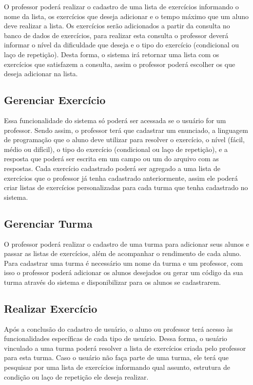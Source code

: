 O professor poderá realizar o cadastro de uma lista de exercícios informando o nome da lista, os exercícios que deseja adicionar e o tempo máximo que um aluno deve realizar a lista. Os exercícios serão adicionados a partir da consulta no banco de dados de exercícios, para realizar esta consulta o professor deverá informar o nível da dificuldade que deseja e o tipo do exercício (condicional ou laço de repetição). Desta forma, o sistema irá retornar uma lista com os exercícios que satisfazem a consulta, assim o professor poderá escolher os que deseja adicionar na lista.

\subsection{Gerenciar Exercício}

Essa funcionalidade do sistema só poderá ser acessada se o usuário for um professor. Sendo assim, o professor terá que cadastrar um enunciado, a linguagem de programação que o aluno deve utilizar para resolver o exercício, o nível (fácil, médio ou difícil), o tipo do exercício (condicional ou laço de repetição), e a resposta que poderá ser escrita em um campo ou um  do arquivo com as respostas. Cada exercício cadastrado poderá ser agregado a uma lista de exercícios que o professor já tenha cadastrado anteriormente, assim ele poderá criar listas de exercícios personalizadas para cada turma que tenha cadastrado no sistema.

\subsection{Gerenciar Turma}

O professor poderá realizar o cadastro de uma turma para adicionar seus alunos e passar as listas de exercícios, além de acompanhar o rendimento de cada aluno. Para cadastrar uma turma é necessário um nome da turma e um professor, com isso o professor poderá adicionar os alunos desejados ou gerar um código da sua turma através do sistema e disponibilizar para os alunos se cadastrarem.

\subsection{Realizar Exercício}

Após a conclusão do cadastro de usuário, o aluno ou professor terá acesso às funcionalidades específicas de cada tipo de usuário. Dessa forma, o usuário vinculado a uma turma poderá resolver a lista de exercícios criada pelo professor para esta turma. Caso o usuário não faça parte de uma turma, ele terá que pesquisar por uma lista de exercícios informando qual assunto, estrutura de condição ou laço de repetição ele deseja realizar.

